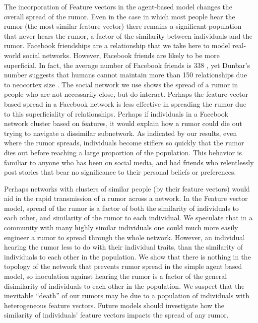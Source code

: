 The incorporation of Feature vectors in the agent-based model changes the overall spread of the rumor.
Even in the case in which most people hear the rumor (the most similar feature vector) there remains a significant population that never hears the rumor, a factor of the similarity between individuals and the rumor.
Facebook friendships are a relationship that we take here to model real-world social networks.
However, Facebook friends are likely to be more superficial.
In fact, the average number of Facebook friends is 338 \cite{smith-2014}, yet Dunbar's number suggests that humans cannot maintain more than 150 relationships due to neocortex size \cite{dunbar-1992}.
The social network we use shows the spread of a rumor in people who are not necessarily close, but do interact.
Perhaps the feature-vector-based spread in a Facebook network is less effective in spreading the rumor due to this superficiality of relationships.
Perhaps if individuals in a Facebook network cluster based on features, it would explain how a rumor could die out trying to navigate a dissimilar subnetwork.
As indicated by our results, even where the rumor spreads, individuals become stiflers so quickly that the rumor dies out before reaching a large proportion of the population.
This behavior is familiar to anyone who has been on social media, and had friends who relentlessly post stories that bear no significance to their personal beliefs or preferences.


Perhaps networks with clusters of similar people (by their feature vectors) would aid in the rapid transmission of a rumor across a network.
In the Feature vector model, spread of the rumor is a factor of both the similarity of individuals to each other, and similarity of the rumor to each individual.
We speculate that in a community with many highly similar individuals one could much more easily engineer a rumor to spread through the whole network.
However, an individual hearing the rumor less to do with their individual traits, than the similarity of individuals to each other in the population.
We show that there is nothing in the topology of the network that prevents rumor spread in the simple agent based model, so inoculation against hearing the rumor is a factor of the general disimilarity of individuals to each other in the population.
We suspect that the inevitable ``death'' of our rumors may be due to a population of individuals with heterogeneous feature vectors.
Future models should investigate how the similarity of individuals' feature vectors impacts the spread of any rumor.


